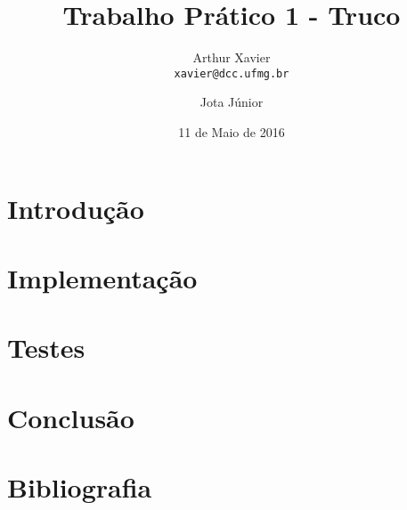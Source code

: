 \documentclass[a4paper,12pt]{article}
\title{Trabalho Prático 1 - Truco}
\author{
    Arthur Xavier\\
    \texttt{xavier@dcc.ufmg.br}
    \and
    Jota Júnior\\
    \texttt{}
}
\date{11 de Maio de 2016}
\begin{document}
\maketitle

\section{Introdução}


\section{Implementação}


\section{Testes}


\section{Conclusão}


\section{Bibliografia}
\end{document}
